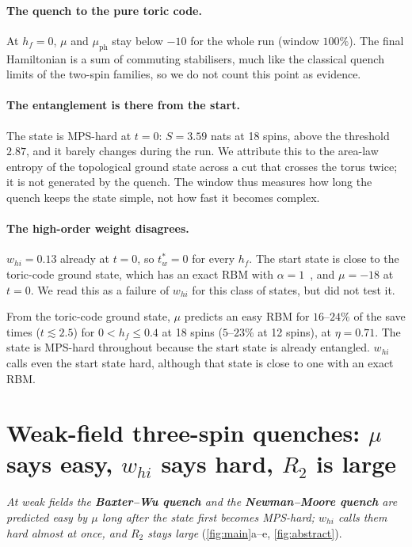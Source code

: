 \documentclass[11pt,a4paper]{article}
\newcommand{\BW}{\textcolor{cBW}{\textbf{Baxter--Wu quench}}}
\newcommand{\NM}{\textcolor{cNM}{\textbf{Newman--Moore quench}}}
\newcommand{\tw}{t^*_w}
\newcommand{\whi}{w_{hi}}
\begin{document}
\paragraph{The quench to the pure toric code.} At $h_f=0$, $\mu$ and $\mu_{\mathrm{ph}}$ stay below $-10$ for the whole
run (window $100\%$). The final Hamiltonian is a sum of commuting stabilisers, much like the classical quench limits of
the two-spin families, so we do not count this point as evidence.

\paragraph{The entanglement is there from the start.} The state is MPS-hard at $t=0$: $S=3.59$ nats at 18 spins,
above the threshold $2.87$, and it barely changes during the run. We attribute this to the area-law entropy of the
topological ground state across a cut that crosses the torus twice; it is not generated by the quench. The window thus
measures how long the quench keeps the state simple, not how fast it becomes complex.

\paragraph{The high-order weight disagrees.} $\whi=0.13$ already at $t=0$, so $\tw=0$ for every $h_f$. The start
state is close to the toric-code ground state, which has an exact RBM with $\alpha=1$~\cite{DengPRB17}, and $\mu=-18$
at $t=0$. We read this as a failure of $\whi$ for this class of states, but did not test it.

\begin{finding}
From the toric-code ground state, $\mu$ predicts an easy RBM for $16$--$24\%$ of the save times ($t\lesssim2.5$) for
$0<h_f\le0.4$ at 18 spins ($5$--$23\%$ at 12 spins), at $\eta=0.71$. The state is MPS-hard throughout because the start
state is already entangled. $\whi$ calls even the start state hard, although that state is close to one with an exact
RBM.
\end{finding}

\section{Weak-field three-spin quenches: $\mu$ says easy, $\whi$ says hard, $R_2$ is large}
\label{sec:threespin}
\emph{At weak fields the \BW{} and the \NM{} are predicted easy by $\mu$ long after the state first becomes
MPS-hard; $\whi$ calls them hard almost at once, and $R_2$ stays large} (\cref{fig:main}a--e, \cref{fig:abstract}).
\end{document}
